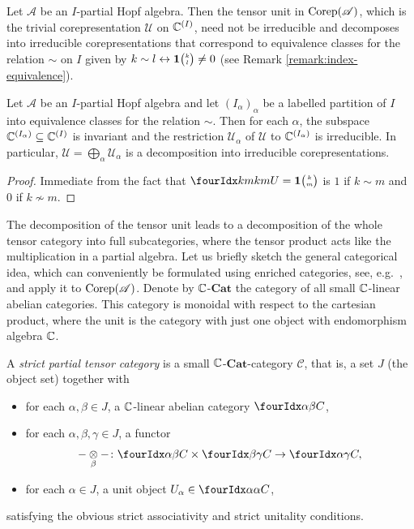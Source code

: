 Let $\mathscr{A}$ be an $I$-partial Hopf algebra.  Then the tensor
unit in $\mathrm{Corep}(\mathscr{A})$, which is the trivial corepresentation
$\mathscr{U}$ on $\mathbb{C}^{(I)}$, need not be irreducible and decomposes
into irreducible corepresentations that correspond to equivalence
classes for the relation $\sim$ on $I$ given by  $k \sim l \leftrightarrow
  \mathbf{1}{\tiny {\begin{pmatrix} k\\l\end{pmatrix}}}\neq 0$ (see Remark
\ref{remark:index-equivalence}).
\begin{Lem}
  Let $\mathscr{A}$ be an $I$-partial Hopf algebra and let
  $(I_{\alpha})_{\alpha}$ be a labelled partition of $I$ into
  equivalence classes for the relation $\sim$.  Then for each $\alpha$, the subspace
  $\mathbb{C}^{(I_{\alpha})} \subseteq \mathbb{C}^{(I)}$ is invariant and the restriction
  $\mathscr{U_{\alpha}}$ of $\mathscr{U}$ to $\mathbb{C}^{(I_{\alpha})}$ is
  irreducible. In particular, $\mathscr{U}=\bigoplus_{\alpha}
  \mathscr{U_{\alpha}}$ is a decomposition into irreducible corepresentations.
\end{Lem}
\begin{proof}
Immediate from the fact that $\Gr{U}{k}{k}{m}{m} = 
  \UnitC{k}{m}$  is $1$  if $k\sim m$  and $0$ if $k\not\sim m$. 
\end{proof}
The decomposition of the tensor unit leads to a decomposition of the
whole tensor category into full subcategories, where the tensor
product acts like the multiplication in a partial algebra. Let us
briefly sketch the general categorical idea, which can conveniently be
formulated using enriched categories, see, e.g.\ \cite{}, and apply it
to $\mathrm{Corep}(\mathscr{A})$.  Denote by $\mathbb{C}$-$\mathbf{Cat}$ the category
of all small $\mathbb{C}$-linear abelian categories. This category is monoidal
with respect to the cartesian product, where the unit is the category
with just one object with endomorphism algebra $\mathbb{C}$.
\begin{Def}
  A \emph{strict partial  tensor category} is a small
  $\mathbb{C}$-$\mathbf{Cat}$-category $\mathscr{C}$, that is, a set $J$ (the object set)
  together with
  \begin{itemize}
  \item for each $\alpha,\beta \in J$, a $\mathbb{C}$-linear abelian category
    $\Gru{C}{\alpha}{\beta}$,
  \item for each $\alpha,\beta,\gamma\in J$, a functor
    \begin{align*}
      -\underset{\beta}{\otimes}- \colon
      \Gru{C}{\alpha}{\beta} \times
      \Gru{C}{\beta}{\gamma} \to
      \Gru{C}{\alpha}{\gamma},
    \end{align*}
  \item for each $\alpha \in J$, a unit object $U_{\alpha} \in
    \Gru{C}{\alpha}{\alpha}$,
  \end{itemize}
satisfying the obvious strict associativity and strict unitality conditions.
\end{Def}

